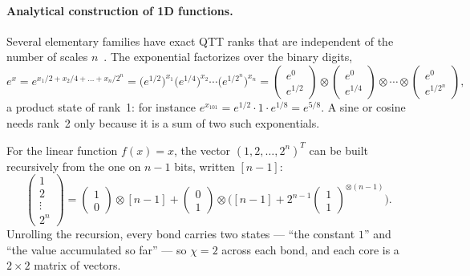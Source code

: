 \paragraph{Analytical construction of 1D functions.}
Several elementary families have exact QTT ranks that are independent of the
number of scales $n$~\cite{Oseledets2013}. The exponential factorizes over the
binary digits,
\begin{equation}
  e^{x} = e^{x_1/2 + x_2/4 + \dots + x_n/2^n}
  = \big(e^{1/2}\big)^{x_1}\big(e^{1/4}\big)^{x_2}\cdots\big(e^{1/2^n}\big)^{x_n}
  = \begin{pmatrix} e^0 \\ e^{1/2} \end{pmatrix} \otimes
    \begin{pmatrix} e^0 \\ e^{1/4} \end{pmatrix} \otimes \cdots \otimes
    \begin{pmatrix} e^0 \\ e^{1/2^n} \end{pmatrix},
  \label{eq:qtt-exp}
\end{equation}%
a product state of rank~1: for instance $e^{x_{101}} = e^{1/2}\cdot 1\cdot
e^{1/8} = e^{5/8}$. A sine or cosine needs rank~2 only because it is a sum of
two such exponentials.

For the linear function $f(x) = x$, the vector $(1, 2, \dots, 2^n)^T$ can be
built recursively from the one on $n-1$ bits, written $[n-1]$:
\begin{equation}
  \begin{pmatrix} 1 \\ 2 \\ \vdots \\ 2^n \end{pmatrix}
  = \begin{pmatrix} 1 \\ 0 \end{pmatrix} \otimes [n-1]
  + \begin{pmatrix} 0 \\ 1 \end{pmatrix} \otimes
    \Big( [n-1] + 2^{n-1} \begin{pmatrix} 1 \\ 1 \end{pmatrix}^{\otimes (n-1)} \Big).
  \label{eq:qtt-linear}
\end{equation}%
Unrolling the recursion, every bond carries two states --- \enquote{the constant
$1$} and \enquote{the value accumulated so far} --- so $\chi = 2$ across each
bond, and each core is a $2\times2$ matrix of vectors.

